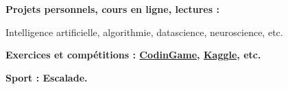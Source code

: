 \textbf{Projets personnels, cours en ligne, lectures :}

Intelligence artificielle, algorithmie, datascience, neuroscience, etc.

\medskip

\textbf{Exercices et comp\'etitions : \href{https://www.codingame.com/profile/43f0f3f88101caf711a71a0e98985c711741781}{CodinGame}, \href{https://www.kaggle.com/}{Kaggle}, etc.}

\medskip

\textbf{Sport : Escalade.}
